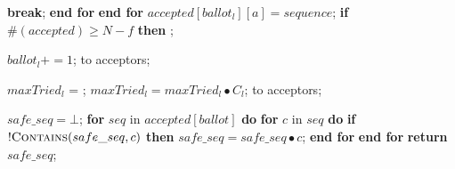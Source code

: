 \begin{algorithm}
\begin{algorithmic}[1]
		\State \hspace{\algorithmicindent}\hspace{\algorithmicindent}\hspace{\algorithmicindent}\hspace{\algorithmicindent}\hspace{\algorithmicindent}\hspace{\algorithmicindent} \textbf{break};
		\State \hspace{\algorithmicindent}\hspace{\algorithmicindent}\hspace{\algorithmicindent}\hspace{\algorithmicindent} \textbf{end for}
		\State \hspace{\algorithmicindent}\hspace{\algorithmicindent}\hspace{\algorithmicindent} \textbf{end for}
		\State \hspace{\algorithmicindent}\hspace{\algorithmicindent}\hspace{\algorithmicindent}  $accepted[ballot_l][a] = sequence$;
		\State
		\State \hspace{\algorithmicindent} \textbf{if} $\#(accepted) \geq N-f$ \textbf{then} 
		\State \hspace{\algorithmicindent}\hspace{\algorithmicindent} ;

		\State
		\State $ballot_l \mathrel{+{=}} 1$;
		\State {} to acceptors;
		\EndFunction
		
		\State
		\State $maxTried_l$ = ;
		\State $maxTried_l = maxTried_l \bullet C_l$;
		\State {} to acceptors;
		\EndFunction
		
		\State
		\State $safe\_seq = \bot$;
		\State \textbf{for} $seq$ in $accepted[ballot]$ \textbf{do}
		\State \hspace{\algorithmicindent} \textbf{for} $c$ in $seq$ \textbf{do} 
		\State \hspace{\algorithmicindent}\hspace{\algorithmicindent} \textbf{if} $!\Call{Contains}{safe\_seq,c}$ \textbf{then}
		\State \hspace{\algorithmicindent}\hspace{\algorithmicindent}\hspace{\algorithmicindent} $safe\_seq =  safe\_seq \bullet c$;
		\State \hspace{\algorithmicindent} \textbf{end for}
		\State \textbf{end for}
		\State \textbf{return} $safe\_seq$;
		\EndFunction
		

\end{algorithmic}
\end{algorithm}
